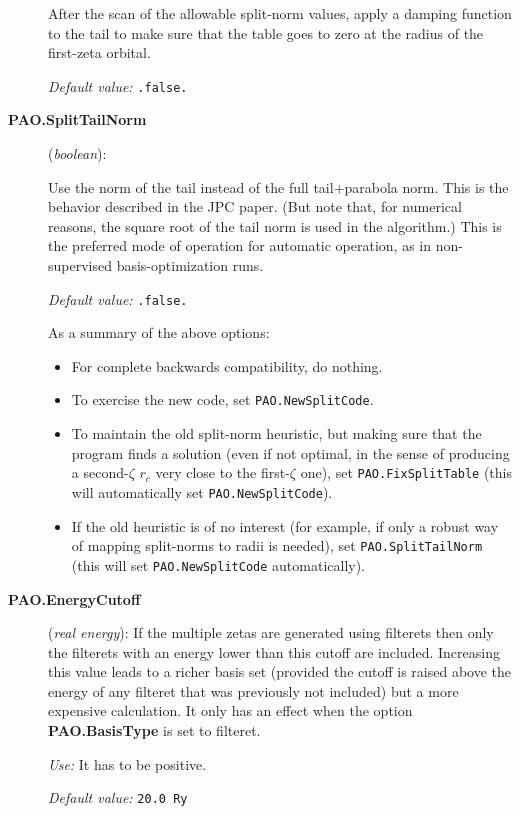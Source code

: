 \begin{description}
After the scan of the allowable split-norm values, apply a damping
function to the tail to make sure that the table goes to zero at
the radius of the first-zeta orbital.

\textit{Default value:} \texttt{.false.}

\item[\textbf{PAO.SplitTailNorm}] (\textit{boolean}):

Use the norm of the tail instead of the full tail+parabola
norm. This is the behavior described in the JPC paper. (But note
that, for numerical reasons, the square root of the tail norm is used
in the algorithm.) This is the preferred mode of operation for
automatic operation, as in non-supervised basis-optimization runs.

\textit{Default value:} \texttt{.false.}

As a summary of the above options:
\begin{itemize}
\item For complete backwards compatibility, do nothing.
\item To exercise the new code, set \texttt{PAO.NewSplitCode}.
\item To maintain the old split-norm heuristic, but
making sure that the program finds a solution (even
if not optimal, in the sense of producing a second-$\zeta$ $r_c$
very close to the first-$\zeta$ one), set \texttt{PAO.FixSplitTable}
(this will automatically set \texttt{PAO.NewSplitCode}).
\item If the old heuristic is of no interest (for example, if
only a robust way of mapping split-norms to radii is needed), set
\texttt{PAO.SplitTailNorm} (this will set \texttt{PAO.NewSplitCode}
automatically).
\end{itemize}

\end{description}

\begin{description}
\item[\textbf{PAO.EnergyCutoff}] (\textit{real energy}): If the multiple
zetas are generated using filterets then only the filterets with
an energy lower than this cutoff are included. Increasing this
value leads to a richer basis set (provided the cutoff is raised
above the energy of any filteret that was previously not included)
but a more expensive calculation.
It only has an effect when the option
\textbf{PAO.BasisType} is set to filteret.

\textit{Use:} It has to be positive.

\textit{Default value:} \texttt{20.0 Ry}
\end{description}

